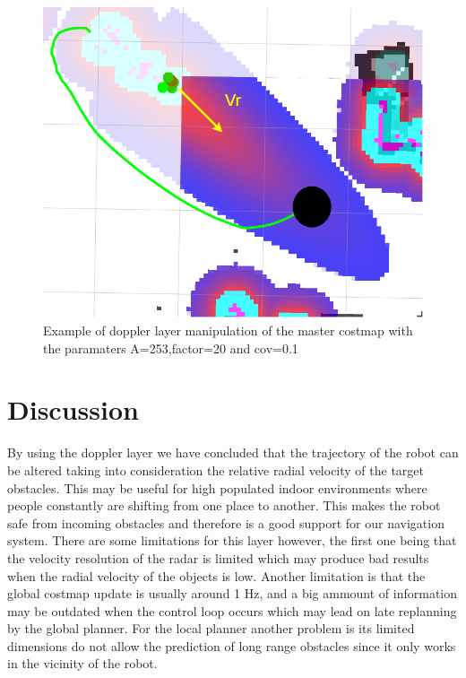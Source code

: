 \begin{figure}[ht!] 
\centerline{\includegraphics [width=1.0 \textwidth]{imgs/chapter6/doppler.png}}
\caption[Doppler layer manipulation of the master costmap]{Example of doppler layer manipulation of the master costmap with the paramaters  A=253,factor=20 and cov=0.1}
\label{fig::doppler}
\end{figure}
\section{Discussion}
By using the doppler layer we have concluded that the trajectory of the robot can be altered taking into consideration the relative radial velocity of the target obstacles. This may be useful for high populated indoor environments where people constantly are shifting from one place to another. This makes the robot safe from incoming obstacles and therefore is a good support for our navigation system. There are some limitations for this layer however, the first one being that the velocity resolution of the radar is limited which may produce bad results when the radial velocity of the objects is low. Another limitation is that the global costmap update is usually around 1 Hz, and a big ammount of information may be outdated when the control loop occurs which may lead on late replanning by the global planner. For the local planner another problem is its limited dimensions do not allow the prediction of long range obstacles since it only works in the vicinity of the robot.


